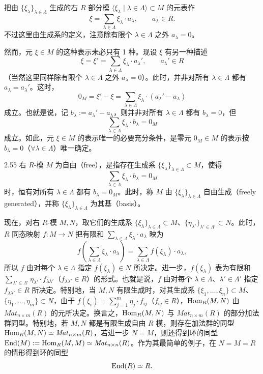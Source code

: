 把由 $\{\xi_\lambda\}_{\lambda\in\Lambda}$ 生成的右 $R$ 部分模 $\langle \xi_\lambda \mid \lambda\in\Lambda\rangle\subset M$ 的元表作
\[
  \xi=\sum_{\lambda\in\Lambda}\xi_\lambda\cdot a_\lambda,\qquad a_\lambda\in R .
\]
不过这里由生成系的定义，注意除有限个 $\lambda\in\Lambda$ 之外 $a_\lambda=0$。

然而，元 $\xi\in M$ 的这种表示未必只有 1 种。现设 $\xi$ 有另一种描述
\[
  \xi=\xi'=\sum_{\lambda\in\Lambda}\xi_\lambda\cdot a_\lambda',\qquad a_\lambda'\in R
\]
（当然这里同样除有限个 $\lambda\in\Lambda$ 之外 $a_\lambda=0$）。此时，并非对所有 $\lambda\in\Lambda$ 都有 $a_\lambda=a_\lambda'$。这时，
\[
  0_M=\xi'-\xi=\sum_{\lambda\in\Lambda}\xi_\lambda\cdot(a_\lambda'-a_\lambda)
\]
成立。也就是说，记 $b_\lambda:=a_\lambda'-a_\lambda$，则并非对所有 $\lambda\in\Lambda$ 都有 $b_\lambda=0$，但
\[
  \sum_{\lambda\in\Lambda}\xi_\lambda\cdot b_\lambda=0_M
\]
成立。如此，元 $\xi\in M$ 的表示唯一的必要充分条件，是零元 $0_M\in M$ 的表示按 $b_\lambda=0$（$\forall\lambda\in\Lambda$）唯一确定。

\begin{definition}{2.55} 右 $R$-模 $M$ 为自由（free），是指存在生成系 $\{\xi_\lambda\}_{\lambda\in\Lambda}\subset M$，使得
\[
  \sum_{\lambda\in\Lambda}\xi_\lambda\cdot b_\lambda=0_M
\]
时，恒有对所有 $\lambda\in\Lambda$ 都有 $b_\lambda=0_M$。此时，称 $M$ 由 $\{\xi_\lambda\}_{\lambda\in\Lambda}$ 自由生成（freely generated），并称 $\{\xi_\lambda\}_{\lambda\in\Lambda}$ 为其基（basis）。\end{definition}


现在，对右 $R$-模 $M,N$，取它们的生成系 $\{\xi_\lambda\}_{\lambda\in\Lambda}\subset M$、$\{\eta_{\lambda'}\}_{\lambda'\in\Lambda'}\subset N$。此时，$R$ 同态映射 $f\colon M\to N$ 把有限和 $\sum_{\lambda\in\Lambda}\xi_\lambda\cdot a_\lambda$ 映为
\[
  f\left(\sum_{\lambda\in\Lambda}\xi_\lambda\cdot a_\lambda\right)=\sum_{\lambda\in\Lambda}f(\xi_\lambda)\cdot a_\lambda,
\]
所以 $f$ 由对每个 $\lambda\in\Lambda$ 指定 $f(\xi_\lambda)\in N$ 所决定。进一步，$f(\xi_\lambda)$ 表为有限和 $\sum_{\lambda'\in\Lambda'}\eta_{\lambda'}\cdot f_{\lambda\lambda'}$（$f_{\lambda\lambda'}\in R$）的形式。也就是说，$f$ 由对每个 $\lambda\in\Lambda$、$\lambda'\in\Lambda'$ 指定 $f_{\lambda\lambda'}\in R$ 所决定。特别地，当 $M,N$ 有限生成时，对其生成系 $\{\xi_1,\ldots,\xi_n\}\subset M$、$\{\eta_1,\ldots,\eta_m\}\subset N$，由于 $f(\xi_i)=\sum_{j=1}^m\eta_j\cdot f_{ij}$（$f_{ij}\in R$），$\operatorname{Hom}_R(M,N)$ 由 $\mathit{Mat}_{n\times m}(R)$ 的元所决定。换言之，$\operatorname{Hom}_R(M,N)$ 与 $\mathit{Mat}_{n\times m}(R)$ 的部分加法群同型。特别地，若 $M,N$ 都是有限生成自由 $R$ 模，则存在加法群的同型 $\operatorname{Hom}_R(M,N)\simeq\mathit{Mat}_{n\times m}(R)$，若进一步 $N=M$，则还得到环的同型 $\operatorname{End}(M):=\operatorname{Hom}_R(M,M)\simeq\mathit{Mat}_{n\times n}(R)$。作为其最简单的例子，在 $N=M=R$ 的情形得到环的同型
\[
  \operatorname{End}(R)\simeq R .
\]

